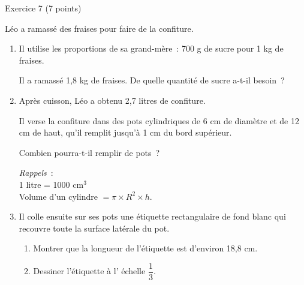 
%
\begin{h2}Exercice 7 (7 points)\end{h2}
\medbreak
Léo a ramassé des fraises pour faire de la confiture.
\medbreak
\begin{enumerate}
     \item Il utilise les proportions de sa grand-mère~: 700 g de sucre pour 1 kg de fraises.
     \par
     Il a ramassé 1,8 kg de fraises. De quelle quantité de sucre a-t-il besoin~?
     \item  Après cuisson, Léo a obtenu 2,7 litres de confiture.
     \par
     Il verse la confiture dans des pots cylindriques de 6 cm de diamètre et de
     12 cm de haut, qu'il remplit jusqu'à 1 cm du bord supérieur.
     \par
     Combien pourra-t-il remplir de pots~?
     \par
     \emph{Rappels}~:\\
     1 litre = 1000 cm$^3$ \\
     Volume d'un cylindre  $= \pi \times R^2 \times h$.
     \item  Il colle ensuite sur ses pots une étiquette rectangulaire de fond blanc qui recouvre toute la surface latérale du pot.
     \begin{enumerate}[label=\alph*.]
          \item Montrer que la longueur de l'étiquette est d'environ 18,8 cm.
          \item Dessiner l'étiquette à l' échelle $\dfrac{1}{3}$.
     \end{enumerate}
\end{enumerate}
